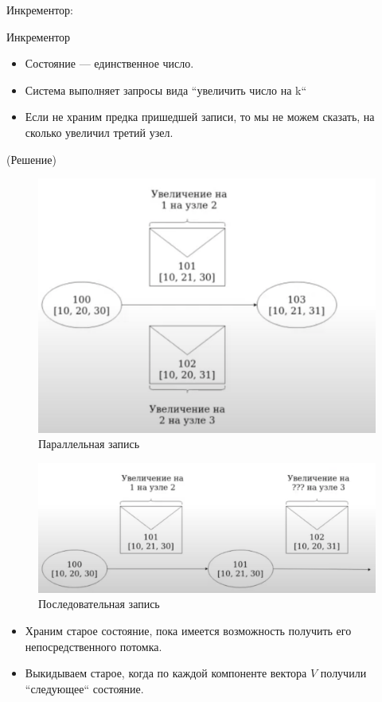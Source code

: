     \begin{example}
      Инкрементор:\\
      \begin{definition}
      Инкрементор
      \end{definition}
        \begin{itemize}
          \item Состояние --- единственное число.
          \item Система выполняет запросы вида ``увеличить число на k``
          \item Если не храним предка пришедшей записи, то мы не можем сказать, на сколько увеличил третий узел.
        \end{itemize}
        \begin{algorithm}(Решение)
          \begin{figure}[h]
              \centering
              \includegraphics[scale = 0.5]{../assets/15.png}
              \caption{Параллельная запись}
          \end{figure}
          \begin{figure}[h]
              \centering
              \includegraphics[scale = 0.5]{../assets/16.png}
              \caption{Последовательная запись}
          \end{figure}
          \begin{itemize}
            \item Храним старое состояние, пока имеется возможность получить его непосредственного потомка.
            \item Выкидываем старое, когда по каждой компоненте вектора $V$ получили ``следующее`` состояние.
          \end{itemize}
        \end{algorithm}
    \end{example}
